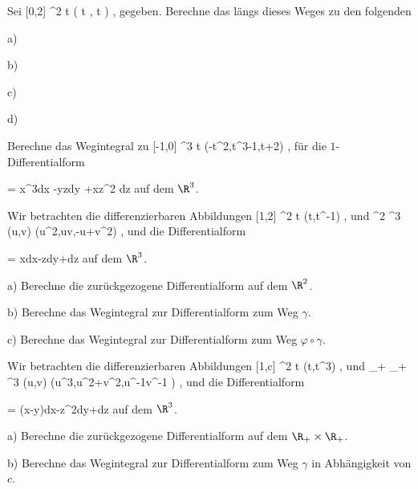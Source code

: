 {}
{

Sei
\maabbeledisp {\gamma} { [0,2\pi] } {\R^2
} { t } {( \cos  t , \sin  t )
} {,}
gegeben. Berechne das
längs dieses Weges zu den folgenden

a)

b)

c)

d)

}
{} {}

{}
{

Berechne das Wegintegral
\mathl{\int_\gamma \omega}{} zu
\maabbeledisp {\gamma} { [-1,0] } {\R^3
} { t } {(-t^2,t^3-1,t+2)
} {,}
für die $1$-Differentialform

\mavergleichskettedisp
{\vergleichskette
{ \omega
}
{ =} { x^3dx -yzdy +xz^2 dz
}
{ } {
}
{ } {
}
{ } {
}
}
{}{}{}
auf dem $\R^3$.

}
{} {}

{}
{

Wir betrachten die differenzierbaren Abbildungen
\maabbeledisp {\gamma} { [1,2] } {\R^2
} { t } {(t,t^{-1})
} {,}
und
\maabbeledisp {\varphi} {\R^2} {\R^3
} {(u,v)} {(u^2,uv,-u+v^2)
} {,}
und die Differentialform

\mavergleichskettedisp
{\vergleichskette
{ \omega
}
{ =} { xdx-zdy+dz
}
{ } {
}
{ } {
}
{ } {
}
}
{}{}{}
auf dem $\R^3$.

a) Berechne die zurückgezogene Differentialform
\mathl{\varphi^* \omega}{} auf dem $\R^2$.

b) Berechne das Wegintegral zur Differentialform
\mathl{\varphi^* \omega}{} zum Weg $\gamma$.

c) Berechne
 {} {}
das Wegintegral zur Differentialform
\mathl{\omega}{} zum Weg $\varphi \circ \gamma$.

}
{} {}

{}
{

Wir betrachten die differenzierbaren Abbildungen
\maabbeledisp {\gamma} { [1,c] } {\R^2
} { t } {(t,t^{3})
} {,}
 {} {}
und
\maabbeledisp {\varphi} {\R_+ \times \R_+ } {\R^3
} {(u,v)} {(u^3,u^2+v^2,u^{-1}v^{-1} )
} {,}
und die Differentialform

\mavergleichskettedisp
{\vergleichskette
{ \omega
}
{ =} { (x-y)dx-z^2dy+dz
}
{ } {
}
{ } {
}
{ } {
}
}
{}{}{}
auf dem $\R^3$.

a) Berechne die zurückgezogene Differentialform
\mathl{\varphi^* \omega}{} auf dem $\R_+ \times \R_+$.

b) Berechne das Wegintegral zur Differentialform
\mathl{\varphi^* \omega}{} zum Weg $\gamma$ in Abhängigkeit von $c$.

}
{} {}

